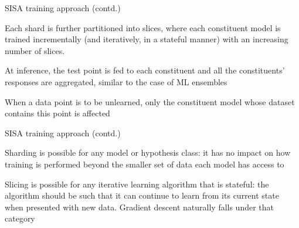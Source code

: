 \documentclass[12pt,aspectratio=169,handout]{beamer}
\begin{document}
\begin{frame}{SISA training approach (contd.)}

Each shard is further partitioned into slices, where each constituent model is trained incrementally (and iteratively, in a stateful manner) with an increasing number of slices.

At inference, the test point is fed to each constituent and all the constituents’ responses are aggregated, similar to the case of ML ensembles


When a data point is to be unlearned, only the constituent model whose dataset contains this point is affected



\end{frame}



\begin{frame}{SISA training approach (contd.)}

Sharding is possible for any model or hypothesis class: it has no impact on how training is performed beyond the smaller set of data each model has access to


Slicing is possible for any iterative learning algorithm that is stateful: the algorithm should be such that it can continue to learn from its current state when presented with new data. Gradient descent naturally falls under that category



\end{frame}
\end{document}
